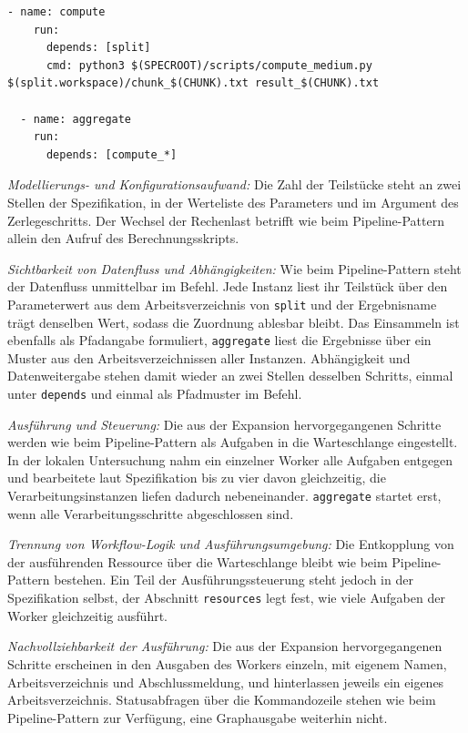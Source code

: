 \begin{lstlisting}[caption={Parametrisierter Verarbeitungsschritt und Fan-in (Merlin, Scatter-Gather)},label={lst:sg:me}]
  - name: compute
    run:
      depends: [split]
      cmd: python3 $(SPECROOT)/scripts/compute_medium.py $(split.workspace)/chunk_$(CHUNK).txt result_$(CHUNK).txt

  - name: aggregate
    run:
      depends: [compute_*]
\end{lstlisting}

\emph{Modellierungs- und Konfigurationsaufwand:} Die Zahl der
Teilstücke steht an zwei Stellen der Spezifikation, in der
Werteliste des Parameters und im Argument des Zerlegeschritts. Der
Wechsel der Rechenlast betrifft wie beim Pipeline-Pattern allein den
Aufruf des Berechnungsskripts.

\emph{Sichtbarkeit von Datenfluss und Abhängigkeiten:} Wie beim
Pipeline-Pattern steht der Datenfluss unmittelbar im Befehl. Jede
Instanz liest ihr Teilstück über den Parameterwert aus dem
Arbeitsverzeichnis von \texttt{split} und der Ergebnisname trägt
denselben Wert, sodass die Zuordnung ablesbar bleibt. Das Einsammeln
ist ebenfalls als Pfadangabe formuliert, \texttt{aggregate} liest die
Ergebnisse über ein Muster aus den Arbeitsverzeichnissen aller
Instanzen. Abhängigkeit und Datenweitergabe stehen damit wieder an
zwei Stellen desselben Schritts, einmal unter \texttt{depends} und
einmal als Pfadmuster im Befehl.

\emph{Ausführung und Steuerung:} Die aus der Expansion hervorgegangenen Schritte werden wie beim Pipeline-Pattern als Aufgaben in die Warteschlange eingestellt. In der lokalen Untersuchung
nahm ein einzelner Worker alle Aufgaben entgegen und bearbeitete
laut Spezifikation bis zu vier davon gleichzeitig, die
Verarbeitungsinstanzen liefen dadurch nebeneinander.
\texttt{aggregate} startet erst, wenn alle Verarbeitungsschritte
abgeschlossen sind.

\emph{Trennung von Workflow-Logik und Ausführungsumgebung:} Die
Entkopplung von der ausführenden Ressource über die Warteschlange
bleibt wie beim Pipeline-Pattern bestehen. Ein Teil der
Ausführungssteuerung steht jedoch in der Spezifikation selbst, der
Abschnitt \texttt{resources} legt fest, wie viele Aufgaben der
Worker gleichzeitig ausführt.


\emph{Nachvollziehbarkeit der Ausführung:} Die aus der Expansion
hervorgegangenen Schritte erscheinen in den Ausgaben des Workers
einzeln, mit eigenem Namen, Arbeitsverzeichnis und Abschlussmeldung,
und hinterlassen jeweils ein eigenes Arbeitsverzeichnis.
Statusabfragen über die Kommandozeile stehen wie beim
Pipeline-Pattern zur Verfügung, eine Graphausgabe weiterhin nicht.


